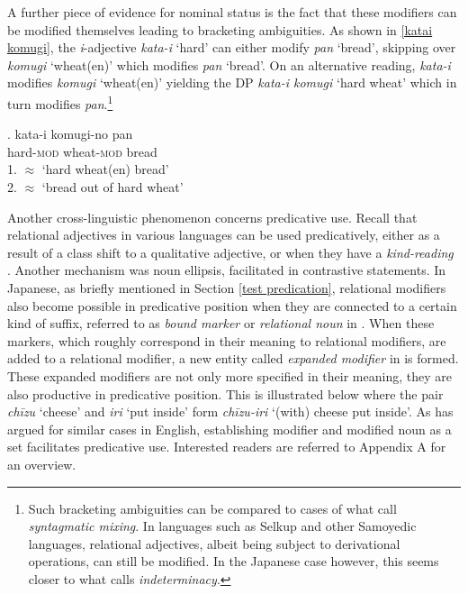 A further piece of evidence for nominal status is the fact that these modifiers can be modified themselves leading to bracketing ambiguities. As shown in \ref{katai komugi}, the \textit{i}-adjective \textit{kata-i} `hard’ can either modify \textit{pan} `bread’, skipping over \textit{komugi} `wheat(en)’ which modifies \textit{pan} `bread’. On an alternative reading, \textit{kata-i} modifies \textit{komugi} `wheat(en)’ yielding the DP \textit{kata-i komugi} `hard wheat’ which in turn modifies \textit{pan}.\footnote{Such bracketing ambiguities can be compared to cases of what \citet{nikolaeva:2020:mixed} call \textit{syntagmatic mixing}. In languages such as Selkup and other Samoyedic languages, relational adjectives, albeit being subject to derivational operations, can still be modified. In the Japanese case however, this seems closer to what \citet{spencer:2005:towards} calls \textit{indeterminacy}.} 

\exg. kata-i komugi-no pan\\
hard-\textsc{mod} wheat-\textsc{mod} bread\\
1. $\approx$ `hard wheat(en) bread’\\
2. $\approx$ `bread out of hard wheat' \label{katai komugi}

Another cross-linguistic phenomenon concerns predicative use. Recall that relational adjectives in various languages can be used predicatively, either as a result of a class shift to a qualitative adjective, or when they have a \textit{kind-reading} \citep{mcnally:2004:relational}. Another mechanism was noun ellipsis, facilitated in contrastive statements. In Japanese, as briefly mentioned in Section \ref{test predication}, relational modifiers also become possible in predicative position when they are connected to a certain kind of suffix, referred to as \textit{bound marker} or \textit{relational noun} in \citet{nagano:2016:are, shimada:2018:relational}. When these markers, which roughly correspond in their meaning to relational modifiers, are added to a relational modifier, a new entity called \textit{expanded modifier} in \citet[54]{nagano:2016:are} is formed. These expanded modifiers are not only more specified in their meaning, they are also productive in predicative position. This is illustrated below where the pair \textit{chīzu} `cheese’ and \textit{iri} `put inside’ form \textit{chīzu-iri} `(with) cheese put inside’. As \citet{levi:1978:syntax} has argued for similar cases in  English, establishing modifier and modified noun as a set facilitates predicative use. Interested readers are referred to Appendix A for an overview. 

